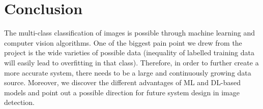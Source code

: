 \documentclass[a4paper, 11pt]{article}
\begin{document}
\section*{Conclusion}
The multi-class classification of images is possible through machine learning and computer vision algorithms. One of the biggest pain point we drew from the project is the wide varieties of possible data (inequality of labelled training data will easily lead to overfitting in that class). Therefore, in order to further create a more accurate system, there needs to be a large and continuously growing data source. Moreover, we discover the different advantages of ML and DL-based models and point out a possible direction for future system design in image detection.

{}

\end{document}
